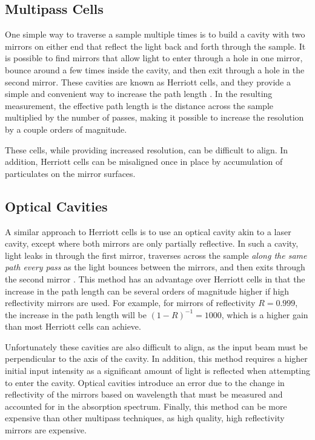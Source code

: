 \subsection{Multipass Cells}\label{subsec:herriott}

One simple way to traverse a sample multiple times is to build a cavity with
two mirrors on either end that reflect the light back and forth through the
sample. It is possible to find mirrors that allow light to enter through a hole
in one mirror, bounce around a few times inside the cavity, and then exit
through a hole in the second mirror. These cavities are known as Herriott
cells, and they provide a simple and convenient way to increase the path
length \cite{Engel:2007va}. In the resulting measurement, the effective path
length is the distance across the sample multiplied by the number of passes,
making it possible to increase the resolution by a couple orders of magnitude.

These cells, while providing increased resolution, can be difficult to align.
In addition, Herriott cells can be misaligned once in place by accumulation of
particulates on the mirror surfaces.

\subsection{Optical Cavities}\label{subsec:cavity}

A similar approach to  Herriott cells is to use an optical cavity akin to a
laser cavity, except where both mirrors are only partially reflective. In such
a cavity, light leaks in through the first mirror, traverses across the sample
\emph{along the same path every pass} as the light bounces between the mirrors,
and then exits through the second mirror \cite{Berden:2009wk}. This method has an advantage over
Herriott cells in that the increase in the path length can be several orders of
magnitude higher if high reflectivity mirrors are used. For example, for
mirrors of reflectivity $R=0.999$, the increase in the path length will be
$(1-R)^{-1} = 1000$, which is a higher gain than most Herriott cells can
achieve.


Unfortunately these cavities are also difficult to align, as the input beam
must be perpendicular to the axis of the cavity. In addition, this method
requires a higher initial input intensity as a significant amount of light is
reflected when attempting to enter the cavity. Optical cavities introduce an
error due to the change in reflectivity of the mirrors based on wavelength that
must be measured and accounted for in the absorption spectrum. Finally, this
method can be more expensive than other multipass techniques, as high quality,
high reflectivity mirrors are expensive.

